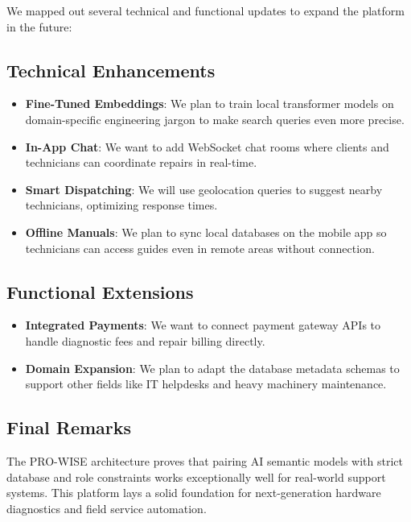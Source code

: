 \documentclass[12pt,a4paper]{report}
\begin{document}
We mapped out several technical and functional updates to expand the platform in the future:

\subsection*{Technical Enhancements}
\begin{itemize}
    \item \textbf{Fine-Tuned Embeddings}: We plan to train local transformer models on domain-specific engineering jargon to make search queries even more precise.
    \item \textbf{In-App Chat}: We want to add WebSocket chat rooms where clients and technicians can coordinate repairs in real-time.
    \item \textbf{Smart Dispatching}: We will use geolocation queries to suggest nearby technicians, optimizing response times.
    \item \textbf{Offline Manuals}: We plan to sync local databases on the mobile app so technicians can access guides even in remote areas without connection.
\end{itemize}

\subsection*{Functional Extensions}
\begin{itemize}
    \item \textbf{Integrated Payments}: We want to connect payment gateway APIs to handle diagnostic fees and repair billing directly.
    \item \textbf{Domain Expansion}: We plan to adapt the database metadata schemas to support other fields like IT helpdesks and heavy machinery maintenance.
\end{itemize}

\subsection*{Final Remarks}

The PRO-WISE architecture proves that pairing AI semantic models with strict database and role constraints works exceptionally well for real-world support systems. This platform lays a solid foundation for next-generation hardware diagnostics and field service automation.
\end{document}
